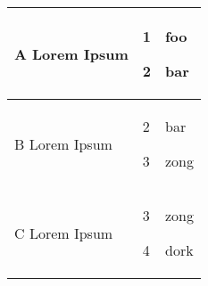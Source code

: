 \begin{table}[h]
\centering {} \small
\begin{tabular}{|p{3cm}|p{1cm}|p{1cm}|}
\hline
A Lorem Ipsum & 1 \par 2 & foo \par bar \\ \hline
B Lorem Ipsum & 2 \par 3 & bar \par zong \\ \hline
C Lorem Ipsum & 3 \par 4 & zong \par dork \\ \hline
\end{tabular}
\end{table}